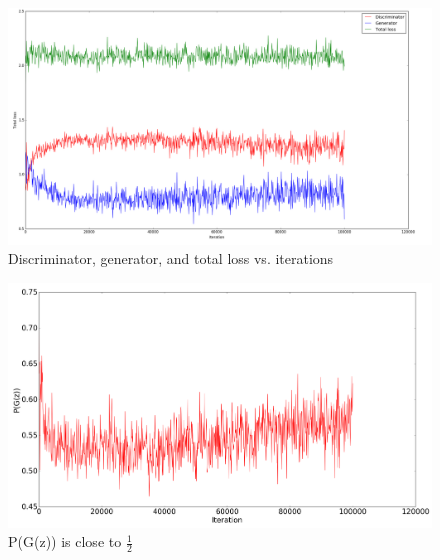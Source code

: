 

\begin{figure}[h]
\centering
\includegraphics[scale=0.25]{GANResults/GANlog.png}
\caption{Discriminator, generator, and total loss vs. iterations }
\label{GANLog}
\end{figure}

\begin{figure}[h]
\centering
\includegraphics[scale=0.25]{GANResults/P(G(z)).png}
\caption{P(G(z)) is close to $\frac{1}{2}$ }
\label{PGz}
\end{figure}

 